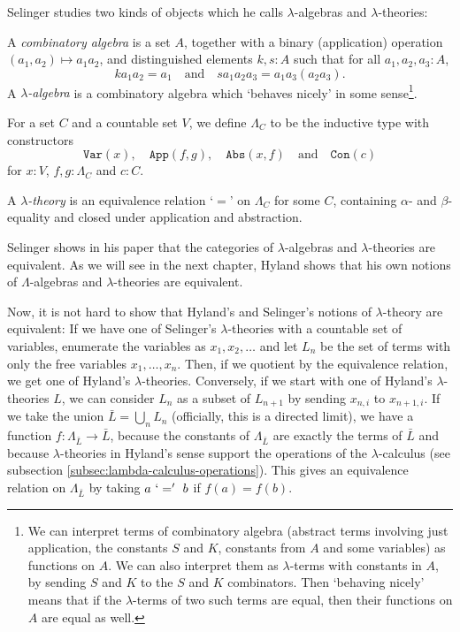 Selinger studies two kinds of objects which he calls $ \lambda $-algebras and $ \lambda $-theories:
\begin{definition}
  A \textit{combinatory algebra} is a set $ A $, together with a binary (application) operation $ (a_1, a_2) \mapsto a_1 a_2 $, and distinguished elements $ k, s : A $ such that for all $ a_1, a_2, a_3 : A $,
  \[ k a_1 a_2 = a_1 \quad \text{and} \quad s a_1 a_2 a_3 = a_1 a_3 (a_2 a_3). \]
  A \textit{$ \lambda $-algebra} is a combinatory algebra which `behaves nicely' in some sense\footnote{We can interpret terms of combinatory algebra (abstract terms involving just application, the constants $ S $ and $ K $, constants from $ A $ and some variables) as functions on $ A $. We can also interpret them as $ \lambda $-terms with constants in $ A $, by sending $ S $ and $ K $ to the $ S $ and $ K $ combinators. Then `behaving nicely' means that if the $ \lambda $-terms of two such terms are equal, then their functions on $ A $ are equal as well.}.
\end{definition}

For a set $ C $ and a countable set $ V $, we define $ \Lambda_C $ to be the inductive type with constructors
\[ \mathtt{Var}(x), \quad \mathtt{App}(f, g), \quad \mathtt{Abs}(x, f) \quad \text{and} \quad \mathtt{Con}(c) \]
for $ x : V $, $ f, g : \Lambda_C $ and $ c : C $.
\begin{definition}
  A \textit{$ \lambda $-theory} is an equivalence relation `$ = $' on $ \Lambda_C $ for some $ C $, containing $ \alpha $- and $ \beta $-equality and closed under application and abstraction.
\end{definition}

Selinger shows in his paper that the categories of $ \lambda $-algebras and $ \lambda $-theories are equivalent. As we will see in the next chapter, Hyland shows that his own notions of $ \Lambda $-algebras and $ \lambda $-theories are equivalent.

Now, it is not hard to show that Hyland's and Selinger's notions of $ \lambda $-theory are equivalent: If we have one of Selinger's $ \lambda $-theories with a countable set of variables, enumerate the variables as $ x_1, x_2, \dots $ and let $ L_n $ be the set of terms with only the free variables $ x_1, \dots, x_n $. Then, if we quotient by the equivalence relation, we get one of Hyland's $ \lambda $-theories. Conversely, if we start with one of Hyland's $ \lambda $-theories $ L $, we can consider $ L_n $ as a subset of $ L_{n + 1} $ by sending $ x_{n, i} $ to $ x_{n + 1, i} $. If we take the union $ \bar L = \bigcup_n L_n $ (officially, this is a directed limit), we have a function $ f: \Lambda_{\bar L} \to \bar L $, because the constants of $ \Lambda_{\bar L} $ are exactly the terms of $ \bar L $ and because $ \lambda $-theories in Hyland's sense support the operations of the $ \lambda $-calculus (see subsection \ref{subsec:lambda-calculus-operations}). This gives an equivalence relation on $ \Lambda_{\bar L} $ by taking $ a\ `='\ b $ if $ f(a) = f(b) $.

